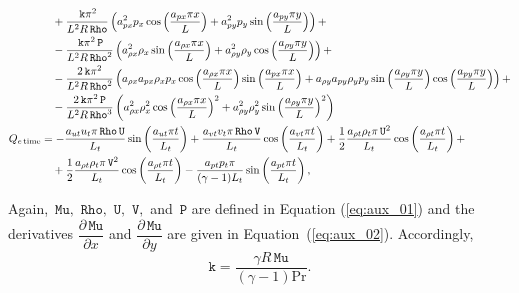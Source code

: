 \documentclass[10pt]{article}
\newcommand{\diff}[2] {\dfrac{\partial #1}{\partial #2}}
\newcommand{\Rho}{\,\mathtt{Rho}}
\newcommand{\PP}{\,\mathtt{P}}
\newcommand{\U}{\,\mathtt{U}}
\newcommand{\V}{\,\mathtt{V}}
\newcommand{\Mu}{\,\mathtt{Mu}}
\newcommand{\DMuDx}{\diff{\Mu}{x}}
\newcommand{\DMuDy}{\diff{\Mu}{y}}
\newcommand{\kk}{\,\mathtt{k}}
\newcommand{\timee}{\,\text{time}}
\begin{document}
\begin{equation*}
\begin{split}
	&\quad+\dfrac{\kk \pi^2}{L^2 R \Rho} \left(a_{px}^2 p_x \cos\left(\dfrac{a_{px} \pi x}{L}\right)+a_{py}^2 p_y \sin\left(\dfrac{a_{py} \pi y}{L}\right)\right) +\\
	&\quad-\dfrac{\kk \pi^2 \PP }{L^2 R \Rho^2}\left(a_{\rho x}^2 \rho_x \sin\left(\dfrac{a_{\rho x} \pi x}{L}\right)+a_{\rho y}^2 \rho_y \cos\left(\dfrac{a_{\rho y} \pi y}{L}\right)\right) +\\
	&\quad -\dfrac{2 \kk \pi^2 }{L^2 R \Rho^2} \left( a_{\rho x} a_{px} \rho_x p_x \cos\left(\dfrac{a_{\rho x} \pi x}{L}\right) \sin\left(\dfrac{a_{px} \pi x}{L}\right)+a_{\rho y} a_{py} \rho_y p_y \sin\left(\dfrac{a_{\rho y} \pi y}{L}\right) \cos\left(\dfrac{a_{py} \pi y}{L}\right)\right)  +\\
	&\quad- \dfrac{2\kk \pi^2 \PP }{L^2 R \Rho^3} \left(a_{\rho x}^2 \rho_x^2 \cos\left(\dfrac{a_{\rho x} \pi x}{L}\right)^2+a_{\rho y}^2 \rho_y^2 \sin\left(\dfrac{a_{\rho y} \pi y}{L}\right)^2\right)  \\ \vspace{15pt}
%
Q_{e \timee} &= -\dfrac{a_{ut} u_t \pi \Rho \U }{L_t} \sin\left(\dfrac{a_{ut} \pi t}{L_t}\right) 
+\dfrac{a_{vt} v_t \pi \Rho \V }{L_t} \cos\left(\dfrac{a_{vt} \pi t}{L_t}\right) 
+\dfrac{1}{2} \dfrac{a_{\rho t} \rho_t \pi \U^2 }{L_t} \cos\left(\dfrac{a_{\rho t} \pi t}{L_t}\right) +\\
	&\quad+\dfrac{1}{2} \dfrac{a_{\rho t} \rho_t \pi \V^2 }{L_t} \cos\left(\dfrac{a_{\rho t} \pi t}{L_t}\right)-\dfrac{a_{pt} p_t \pi}{(\gamma-1) L_t}\sin\left(\dfrac{a_{pt} \pi t}{L_t}\right) ,
\end{split}
\end{equation*}

Again, $\Mu,\, \Rho,\,\U,\,\V,$ and $\PP$ are defined in Equation (\ref{eq:aux_01}) and the derivatives $\DMuDx$ and $\DMuDy$ are given in Equation~(\ref{eq:aux_02}).
Accordingly,
$$\texttt{k}=\dfrac{\gamma R \Mu}{(\gamma-1)\text{Pr}}.$$
\end{document}
